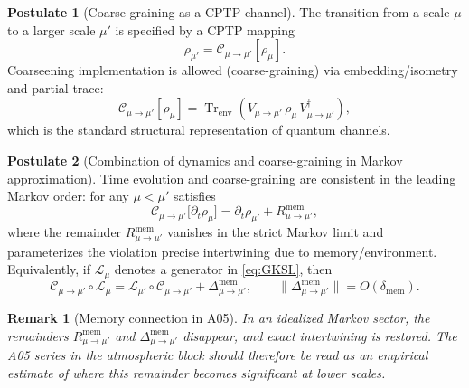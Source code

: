 \documentclass[11pt,a4paper]{article}
\DeclareMathOperator{\Tr}{Tr}
\theoremstyle{definition}
\newtheorem{axiom}{Postulate}[section]
\theoremstyle{plain}
\newtheorem{remark}{Remark}[section]
\theoremstyle{remark}
\begin{document}
\begin{axiom}[Coarse-graining as a CPTP channel]\label{ax:CPTP}
The transition from a scale $\mu$ to a larger scale $\mu'$ is specified by a CPTP mapping
\begin{equation}\label{eq:CPTP}
\rho_{\mu'} = \mathcal C_{\mu\to\mu'}[\rho_\mu].
\end{equation}
Coarseening implementation is allowed (coarse-graining) via embedding/isometry and partial trace:
\begin{equation}\label{eq:CPTP_dilation}
\mathcal C_{\mu\to\mu'}[\rho_\mu]
=
\Tr_{\mathrm{env}}
\!\left(
V_{\mu\to\mu'}\,\rho_\mu\,V_{\mu\to\mu'}^\dagger
\right),
\end{equation}
which is the standard structural representation of quantum channels\cite{Kraus1983StatesEffectsOperations,Stinespring1955PositiveFunctions,NielsenChuang2000QCQI}.
\end{axiom}

\begin{axiom}[Combination of dynamics and coarse-graining in Markov approximation]\label{ax:compatibility}
Time evolution and coarse-graining are consistent in the leading Markov order:
for any $\mu<\mu'$ satisfies
\begin{equation}\label{eq:intertwining}
\mathcal C_{\mu\to\mu'}\bigl[\partial_t\rho_\mu\bigr]
=
\partial_t\rho_{\mu'}
+
R^{\mathrm{mem}}_{\mu\to\mu'},
\end{equation}
where the remainder $R^{\mathrm{mem}}_{\mu\to\mu'}$ vanishes in the strict Markov limit
and parameterizes the violation precise intertwining due to memory/environment.
Equivalently, if $\mathcal L_\mu$ denotes a generator in \eqref{eq:GKSL}, then
\begin{equation}\label{eq:intertwining_generator}
\mathcal C_{\mu\to\mu'}\circ \mathcal L_\mu
=
\mathcal L_{\mu'}\circ \mathcal C_{\mu\to\mu'}
+
\Delta^{\mathrm{mem}}_{\mu\to\mu'},
\qquad
\|\Delta^{\mathrm{mem}}_{\mu\to\mu'}\| = O(\delta_{\mathrm{mem}}).
\end{equation}
\end{axiom}

\begin{remark}[Memory connection in A05]\label{rem:compatibility_memory}
In an idealized Markov sector, the remainders $R^{\mathrm{mem}}_{\mu\to\mu'}$ and $\Delta^{\mathrm{mem}}_{\mu\to\mu'}$
disappear, and exact intertwining is restored. The A05 series in the atmospheric block should therefore be read
as an empirical estimate of where this remainder becomes significant at lower scales.
\end{remark}
\end{document}

